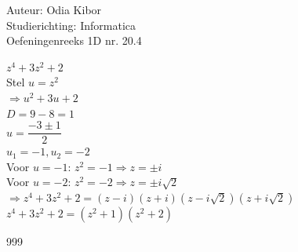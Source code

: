 \documentclass[a4paper]{article}
\begin{document}
  
\noindent \large Auteur: Odia Kibor \\
\noindent \large Studierichting: Informatica\\
\noindent \large Oefeningenreeks 1D nr. 20.4\\

\medskip

\normalsize

$z^4 + 3z^2 + 2$\\

Stel $u = z^2$\\

$\Rightarrow u^2 + 3u + 2$\\

$D= 9 - 8 = 1$\\

$u = \dfrac{-3 \pm 1}{2}$\\

$u_1 = -1, u_2 = -2$\\

Voor $u = -1$: $z^2 = -1 \Rightarrow z = \pm i$\\

Voor $u = -2$: $z^2 = -2 \Rightarrow z = \pm i\sqrt{2}$\\

$\Rightarrow z^4 + 3z^2 + 2 = (z -i)(z + i)(z - i\sqrt{2})(z + i\sqrt{2})$\\

$z^4 + 3z^2 + 2 = (z^2 + 1)(z^2 + 2)$\\









\begin{thebibliography}{999}
\end{thebibliography}
\end{document}
